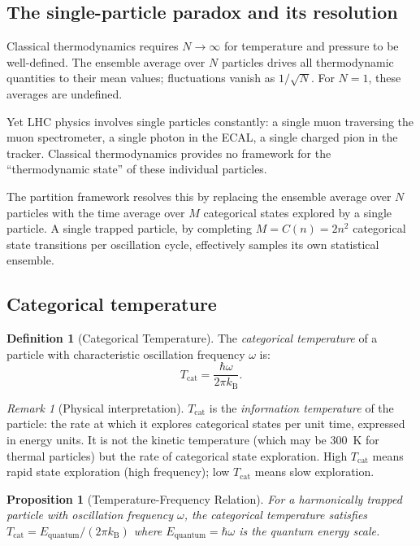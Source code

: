 \documentclass[twocolumn,10pt,a4paper]{article}
\theoremstyle{thmstyle}
\newtheorem{proposition}[theorem]{Proposition}
\theoremstyle{definition}
\newtheorem{definition}[theorem]{Definition}
\theoremstyle{remark}
\newtheorem{remark}[theorem]{Remark}
\newcommand{\kB}{k_{\mathrm{B}}}
\begin{document}
\subsection{The single-particle paradox and its resolution}

Classical thermodynamics requires $N \to \infty$ for temperature and pressure
to be well-defined. The ensemble average over $N$ particles drives all
thermodynamic quantities to their mean values; fluctuations vanish as
$1/\sqrt{N}$. For $N = 1$, these averages are undefined.

Yet LHC physics involves single particles constantly: a single muon traversing
the muon spectrometer, a single photon in the ECAL, a single charged pion
in the tracker. Classical thermodynamics provides no framework for the
``thermodynamic state'' of these individual particles.

The partition framework resolves this by replacing the ensemble average
over $N$ particles with the time average over $M$ categorical states
explored by a single particle. A single trapped particle, by completing
$M = C(n) = 2n^2$ categorical state transitions per oscillation cycle,
effectively samples its own statistical ensemble.

\subsection{Categorical temperature}

\begin{definition}[Categorical Temperature]
\label{def:Tcat}
The \emph{categorical temperature} of a particle with characteristic
oscillation frequency $\omega$ is:
\begin{equation}
T_{\mathrm{cat}} = \frac{\hbar\omega}{2\pi\kB}.
\label{eq:Tcat}
\end{equation}
\end{definition}

\begin{remark}[Physical interpretation]
$T_{\mathrm{cat}}$ is the \emph{information temperature} of the particle:
the rate at which it explores categorical states per unit time, expressed
in energy units. It is not the kinetic temperature (which may be 300~K for
thermal particles) but the rate of categorical state exploration.
High $T_{\mathrm{cat}}$ means rapid state exploration (high frequency);
low $T_{\mathrm{cat}}$ means slow exploration.
\end{remark}

\begin{proposition}[Temperature-Frequency Relation]
\label{prop:temp_freq}
For a harmonically trapped particle with oscillation frequency $\omega$,
the categorical temperature satisfies $T_{\mathrm{cat}} = E_{\mathrm{quantum}}/(2\pi\kB)$
where $E_{\mathrm{quantum}} = \hbar\omega$ is the quantum energy scale.
\end{proposition}
\end{document}
